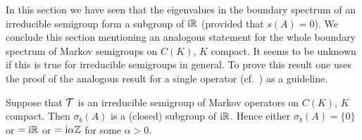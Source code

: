 In this section we have seen that the eigenvalues in the boundary spectrum of an irreducible semigroup form a subgroup of $\mathrm{i} \mathbb{R}$ (provided that $s(A) = 0$).
We conclude this section mentioning an analogous statement for the whole boundary spectrum of Markov semigroups on $C(K)$, $K$ compact.
It seems to be unknown if this is true for irreducible semigroups in general.
To prove this result one uses the proof of the analogous result for a single operator (cf.\ \citet[Theorem~7]{schaefer:1968}) as a guideline.
\begin{theorem}\label{thm:b3-3.11}
	Suppose that $\mathcal{T}$ is an irreducible semigroup of Markov operators on $C(K)$, $K$ compact.
	Then $\sigma_{b}(A)$ is a (closed) subgroup of $\mathrm{i} \mathbb{R}$.
	Hence either $\sigma_{b}(A) = \{0\}$ or $= \mathrm{i}\mathbb{R}$ or $= \mathrm{i}\alpha\mathbb{Z}$ for some $\alpha > 0$.
\end{theorem}

